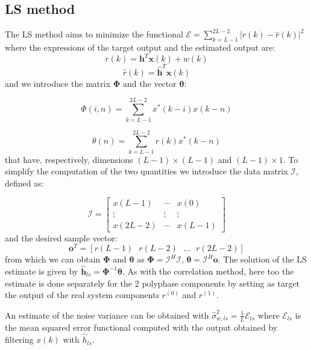 \documentclass[a4paper,11.5pt]{article}
\newcommand{\vt}{\boldsymbol}
\begin{document}
\subsection*{LS method}

The LS method aims to minimize the functional $\mathcal{E} = \sum_{k=L-1}^{2L-2}|r(k)-\hat{r}(k)|^2$ where the expressions of the target output and the estimated output are:
\begin{equation}
r(k)=\vt{h}^T\vt{x}(k)+w(k)
\end{equation}
\begin{equation}
\hat{r}(k)=\hat{\vt{h}}^T\vt{x}(k)
\end{equation}
\noindent and we introduce the matrix $\vt{\Phi}$ and the vector $\vt{\theta}$:

\begin{equation}
\Phi (i,n)=\sum_{k=L-1}^{2L-2}x^*(k-i)x(k-n)
\end{equation}

\begin{equation}
\theta (n)=\sum_{k=L-1}^{2L-2}r(k)x^*(k-n)
\end{equation}
\noindent that have, respectively, dimensions $(L-1)\times(L-1)$ and $(L-1)\times 1$. To simplify the computation of the two quantities we introduce the data matrix $\boldsymbol{\mathcal{I}}$, defined as:

\begin{equation}
\vt{\mathcal{I}} =
\begin{bmatrix}
x(L-1)	& \cdots &	x(0) \\
\vdots	& \vdots & \vdots \\
x(2L-2)	& \cdots &	x(L-1)
\end{bmatrix}
\end{equation}
\noindent and the desired sample vector:
\begin{equation}
\vt{o}^T=[r(L-1) \ \ \ r(L-2) \ \ \  \dots \ \ \ r(2L-2)]
\end{equation}
\noindent from which we can obtain $\vt{\Phi}$ and $\vt{\theta}$ as  $\vt{\Phi}=\vt{\mathcal{I}}^H\vt{\mathcal{I}}$, $\vt{\theta}=\vt{\mathcal{I}}^H\vt{o}$. 
The solution of the LS estimate is given by $\hat{\vt{h}}_{ls}=\vt{\Phi}^{-1}\vt{\theta}$. 
As with the correlation method, here too the estimate is done separately for the 2 polyphase components by setting as target the output of the real system components $r^{(0)}$ and $r^{(1)}$. 

An estimate of the noise variance can be obtained with $\hat{\sigma}_{w,ls}^2=\frac{1}{L}\mathcal{E}_{ls} $ where $\mathcal{E}_{ls}$ is the mean squared error functional computed with the output obtained by filtering $x(k)$ with $\hat{h}_{ls}$.
\end{document}
